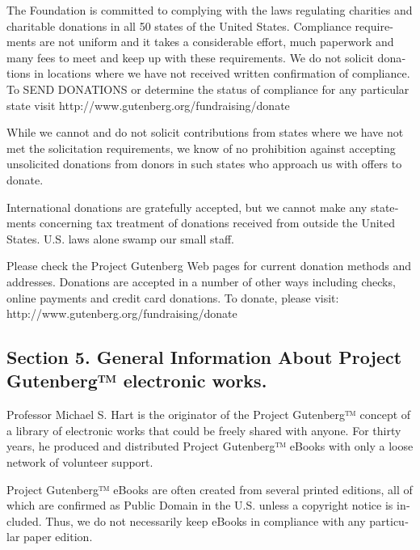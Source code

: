 \documentclass[a5paper]{book}
\begin{document}
\begin{german}
\begin{english}
\begin{pgfooter_env}
The Foundation is committed to complying with the laws regulating
charities and charitable donations in all 50 states of the United
States. Compliance requirements are not uniform and it takes a
considerable effort, much paperwork and many fees to meet and keep up
with these requirements. We do not solicit donations in locations
where we have not received written confirmation of compliance. To SEND
DONATIONS or determine the status of compliance for any particular
state visit {http://www.gutenberg.org/fundraising/donate}\par

While we cannot and do not solicit contributions from states where we
have not met the solicitation requirements, we know of no prohibition
against accepting unsolicited donations from donors in such states who
approach us with offers to donate.\par

International donations are gratefully accepted, but we cannot make
any statements concerning tax treatment of donations received from
outside the United States. U.S. laws alone swamp our small staff.\par

Please check the Project Gutenberg Web pages for current donation
methods and addresses. Donations are accepted in a number of other
ways including checks, online payments and credit card donations. To
donate, please visit: {http://www.gutenberg.org/fundraising/donate}\par

%
\label{section-5-general-information-about-project-gutenberg-electronic-works}%
\hypertarget{section-5-general-information-about-project-gutenberg-electronic-works}{}%
%
\subsection*{Section 5. General Information About Project Gutenberg™ electronic works.}


Professor Michael S. Hart is the originator of the Project Gutenberg™
concept of a library of electronic works that could be freely shared
with anyone. For thirty years, he produced and distributed Project
Gutenberg™ eBooks with only a loose network of volunteer support.\par

Project Gutenberg™ eBooks are often created from several printed
editions, all of which are confirmed as Public Domain in the
U.S. unless a copyright notice is included. Thus, we do not
necessarily keep eBooks in compliance with any particular paper
edition.\par


\end{pgfooter_env}
\end{english}
\end{german}
\end{document}
